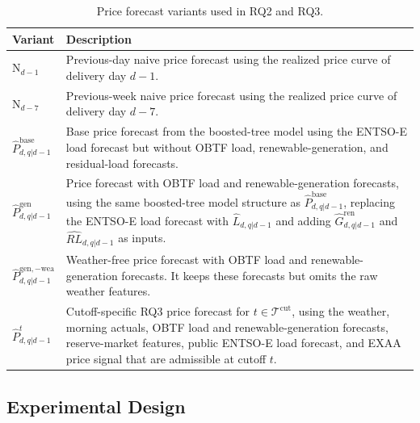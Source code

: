 \begin{table}[H]
  \centering
  \small
  \caption[Price forecast model variants and their inputs.]
  {Price forecast variants used in RQ2 and RQ3.}
  \label{tab:price_model_variants}
  \begin{tabular}{@{}>{\raggedright\arraybackslash}p{}
                  >{\raggedright\arraybackslash}p{}@{}}
    \toprule
    Variant & Description \\
    \midrule
    \(\mathrm{N}_{d-1}\)
    & Previous-day naive price forecast using the realized price curve of
      delivery day \(d-1\). \\
    \addlinespace
    \(\mathrm{N}_{d-7}\)
    & Previous-week naive price forecast using the realized price curve of
      delivery day \(d-7\). \\
    \addlinespace
    \(\hat{P}^{\mathrm{base}}_{d,q|d-1}\)
    & Base price forecast from the boosted-tree model using the
      \mbox{ENTSO-E} load forecast but without OBTF load,
      renewable-generation, and residual-load forecasts. \\
    \addlinespace
    \(\hat{P}^{\mathrm{gen}}_{d,q|d-1}\)
    & Price forecast with OBTF load and renewable-generation forecasts, using the same boosted-tree model
      structure as
      \(\hat{P}^{\mathrm{base}}_{d,q|d-1}\), replacing the \mbox{ENTSO-E} load
      forecast with \(\hat{L}_{d,q|d-1}\) and adding
      \(\hat{G}^{\mathrm{ren}}_{d,q|d-1}\) and
      \(\widehat{RL}_{d,q|d-1}\) as inputs. \\
    \addlinespace
    \(\hat{P}^{\mathrm{gen},-\mathrm{wea}}_{d,q|d-1}\)
    & Weather-free price forecast with OBTF load and renewable-generation
      forecasts. It keeps these forecasts but omits the raw weather features. \\
    \addlinespace
    \(\hat{P}^{t}_{d,q|d-1}\)
    & Cutoff-specific RQ3 price forecast for
      \(t \in \mathcal{T}^{\mathrm{cut}}\), using the weather, morning actuals, OBTF load and renewable-generation forecasts, reserve-market features, public
      \mbox{ENTSO-E} load forecast, and EXAA price signal that are admissible
      at cutoff \(t\). \\
    \bottomrule
  \end{tabular}
\end{table}

\subsection{Experimental Design}
\label{sec:experimental_design}

